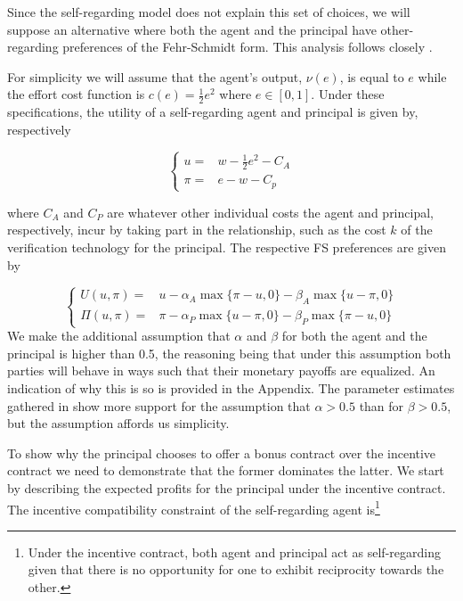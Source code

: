 \documentclass[12pt]{article}
\begin{document}
Since the self-regarding model does not explain this set of choices, we will suppose an alternative where both the agent and the principal have other-regarding preferences of the Fehr-Schmidt form. This analysis follows closely \cite{dhami2016foundations}. 

For simplicity we will assume that the agent's output, $\nu(e)$, is equal to $e$ while the effort cost function is $c(e)=\frac{1}{2}e^2$ where $e\in[0,1]$. Under these specifications, the utility of a self-regarding agent and principal is given by, respectively

\begin{equation}
	\left\{\begin{matrix}
	u =  & w - \frac{1}{2} e^2 - C_A\\ 
	\pi= & e - w - C_p
	\end{matrix}\right.
\end{equation}

\noindent
where $C_A$ and $C_P$ are whatever other individual costs the agent and principal, respectively, incur by taking part in the relationship, such as the cost $k$ of the verification technology for the principal. The respective FS preferences are given by


\begin{equation}
\left\{\begin{matrix}
U\left(u,\pi\right) =  &  u - \alpha_A \max\{\pi-u,0\}-\beta_A \max\{u-\pi,0\}\\ 
\Pi \left(u,\pi\right)= & \pi - \alpha_P \max\{u-\pi,0\}-\beta_P \max\{\pi-u,0\}
\end{matrix}\right.
\end{equation}
We make the additional assumption that $\alpha$ and $\beta$ for both the agent and the principal is higher than 0.5, the reasoning being that under this assumption both parties will behave in ways such that their monetary payoffs are equalized. An indication of why this is so is provided in the Appendix. The parameter estimates gathered in \cite{Eckel2010} show more support for the assumption that $\alpha >0.5$ than for $\beta > 0.5$, but the assumption affords us simplicity.

To show why the principal chooses to offer a bonus contract over the incentive contract we need to demonstrate that the former dominates the latter. We start by describing the expected profits for the principal under the incentive contract. The incentive compatibility constraint of the self-regarding agent is\footnote{Under the incentive contract, both agent and principal act as self-regarding given that there is no opportunity for one to exhibit reciprocity towards the other.}  
\end{document}
